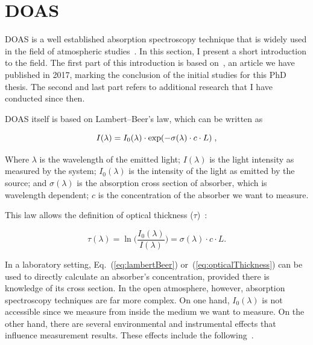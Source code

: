 
\section{\gls{DOAS}}%
\label{sec:doas}

\acrlong{DOAS} is a well established absorption spectroscopy technique
that is widely used in the field of atmospheric
studies~\cite{Platt2007}. In this section, I present a short
introduction to the field. The first part of this introduction is based
on~\cite{ValentedeAlmeida2017}, an article we have published in 2017,
marking the conclusion of the initial studies for this PhD thesis. The
second and last part refers to additional research that I have conducted
since then.

\gls{DOAS} itself is based on Lambert--Beer's law, which can be written
as \cite{Platt2007}

\begin{equation}
  \centering
  \label{eq:lambertBeer}
  I(\lambda) = I_0 (\lambda) \cdot \exp(-\sigma(\lambda) \cdot c \cdot L) \;,
\end{equation}

Where $\lambda$ is the wavelength of the emitted light; $I(\lambda)$ is
the light intensity as measured by the system; $I_{0}(\lambda)$ is the
intensity of the light as emitted by the source; and $\sigma(\lambda)$
is the absorption cross section of absorber, which is wavelength
dependent; $c$ is the concentration of the absorber we want to measure.

This law allows the definition of optical thickness
($\tau$)~\cite{Platt2007}:

\begin{equation}
      \label{eq:opticalThickness}
      \tau(\lambda) = \ln \bigg( \frac{I_{0}(\lambda)}{I(\lambda)}\bigg)
      = \sigma(\lambda) \cdot c \cdot L.
\end{equation}

In a laboratory setting, Eq.~(\ref{eq:lambertBeer})
or~(\ref{eq:opticalThickness}) can be used to directly calculate an
absorber's concentration, provided there is knowledge of  its cross
section. In the open atmosphere, however, absorption spectroscopy
techniques are far more complex. On one hand, $I_0(\lambda)$ is not
accessible since we measure from inside the medium we want to measure.
On the other hand, there are several environmental and instrumental
effects that influence measurement results. These effects include the
following~\cite{Platt2007}.

